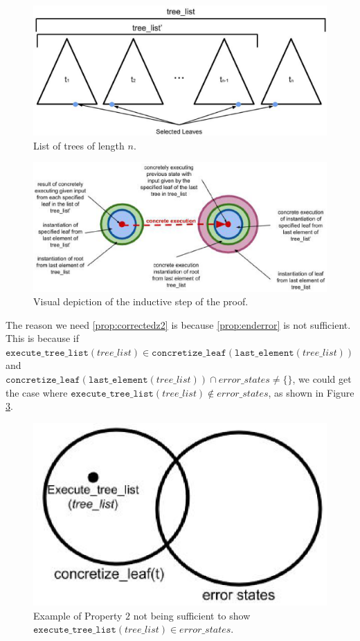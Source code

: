 \begin{figure}
\centering
\includegraphics[width=.8\textwidth]{tlist.eps}
\caption{List of trees of length $n$.}
\label{fig:tlist}
\end{figure}

\begin{figure}
\centering
\includegraphics[width=.8\textwidth]{set4.eps}
\caption{Visual depiction of the inductive step of the proof.}
\label{fig:indstep}
\end{figure}




The reason we need \ref{prop:correctedz2} is because \ref{prop:enderror} is not sufficient. 
This is because if $\mathtt{execute\_tree\_list} (tree\_list) \in \mathtt{concretize\_leaf} (\mathtt{last\_element}(tree\_list))$ and \\
$\mathtt{concretize\_leaf} (\mathtt{last\_element} (tree\_list)) \cap error\_states \neq \{\}$, we could get the case where
$\mathtt{execute\_tree\_list} (tree\_list) \notin error\_states$, as shown in Figure \ref{fig:Prop2}.

\begin{figure}
  \centering
\includegraphics[width=.4\textwidth]{prop2.eps}
\caption{Example of Property $2$ not being sufficient to show $\mathtt{execute\_tree\_list} (tree\_list) \in error\_states$.}
\label{fig:Prop2}
\end{figure}
